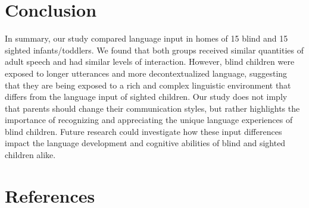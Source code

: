 \documentclass[
  man,floatsintext]{apa6}
\begin{document}
\hypertarget{conclusion}{%
\section{Conclusion}\label{conclusion}}

In summary, our study compared language input in homes of 15 blind and 15 sighted infants/toddlers. We found that both groups received similar quantities of adult speech and had similar levels of interaction. However, blind children were exposed to longer utterances and more decontextualized language, suggesting that they are being exposed to a rich and complex linguistic environment that differs from the language input of sighted children. Our study does not imply that parents should change their communication styles, but rather highlights the importance of recognizing and appreciating the unique language experiences of blind children. Future research could investigate how these input differences impact the language development and cognitive abilities of blind and sighted children alike.

\hypertarget{references}{%
\section*{References}\label{references}}
\end{document}
